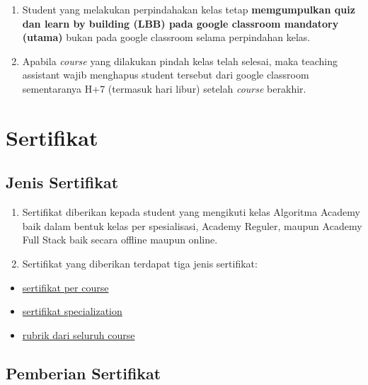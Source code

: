 \documentclass[
]{book}
\providecommand{\tightlist}{%
  \setlength{\itemsep}{0pt}\setlength{\parskip}{0pt}}
\begin{document}
\begin{enumerate}
\def\labelenumi{\arabic{enumi}.}
\setcounter{enumi}{4}
\tightlist
\item
  Student yang melakukan perpindahakan kelas tetap \textbf{memgumpulkan quiz dan learn by building (LBB) pada google classroom mandatory (utama)} bukan pada google classroom selama perpindahan kelas.
\item
  Apabila \emph{course} yang dilakukan pindah kelas telah selesai, maka teaching assistant wajib menghapus student tersebut dari google classroom sementaranya H+7 (termasuk hari libur) setelah \emph{course} berakhir.
\end{enumerate}

\hypertarget{sertifikat}{%
\section{Sertifikat}\label{sertifikat}}

\hypertarget{jenis-sertifikat}{%
\subsection{Jenis Sertifikat}\label{jenis-sertifikat}}

\begin{enumerate}
\def\labelenumi{\arabic{enumi}.}
\tightlist
\item
  Sertifikat diberikan kepada student yang mengikuti kelas Algoritma Academy baik dalam bentuk kelas per spesialisasi, Academy Reguler, maupun Academy Full Stack baik secara offline maupun online.
\item
  Sertifikat yang diberikan terdapat tiga jenis sertifikat:
\end{enumerate}

\begin{itemize}
\tightlist
\item
  \href{https://drive.google.com/file/d/1TrBBxXDQkui3kyf-ZV6I_X5nIl3GVPWk/view?usp=sharing}{sertifikat per course}
\item
  \href{https://drive.google.com/file/d/1YKMvF6K_t-k412lpVTsfU7CQ2ElPbDiw/view?usp=sharing}{sertifikat specialization}
\item
  \href{https://drive.google.com/file/d/1iXF1Ui3pOd0Iz2krhH3U-5BTjSCdUQ5l/view?usp=sharing}{rubrik dari seluruh course}
\end{itemize}

\hypertarget{pemberian-sertifikat}{%
\subsection{Pemberian Sertifikat}\label{pemberian-sertifikat}}
\end{document}
